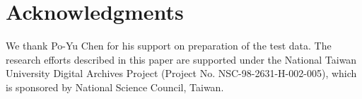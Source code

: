 
\section*{Acknowledgments}

We thank Po-Yu Chen for his support on preparation of the test data.  The
research efforts described in this paper are supported under the National Taiwan
University Digital Archives Project (Project No.  NSC-98-2631-H-002-005), which
is sponsored by National Science Council, Taiwan. 
